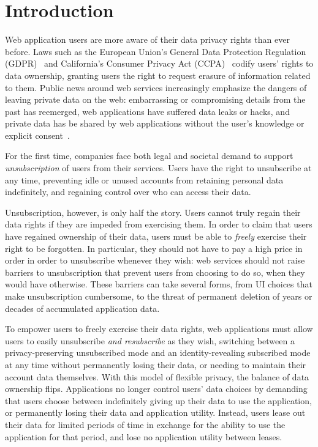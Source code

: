 \section{Introduction}

Web application users are more aware of their data privacy rights than ever before. 
Laws such as the European Union's General Data Protection Regulation (GDPR)~\cite{eu:gdpr} and
California's Consumer Privacy Act (CCPA)~\cite{ca:privacy-act} codify users' rights to 
data ownership, granting users the right to request erasure of information related to them.
%
Public news around web services increasingly emphasize the dangers of leaving private data on the
web: embarrassing or compromising details from the past has reemerged, web applications have 
suffered data leaks or hacks, and private data has be shared by web applications without the user's
knowledge or explicit consent~\cite{nytimes:fb, npr:data}.

%
For the first time, companies face both legal and societal demand to support \emph{unsubscription}
of users from their services. Users have the right to unsubscribe at any time, preventing 
idle or unused accounts from retaining personal data indefinitely, and regaining control over who
can access their data. 
%

%
Unsubscription, however, is only half the story. Users cannot truly regain their data rights if they
are impeded from exercising them.  In order to claim that users have regained ownership of their
data, users must be able to \emph{freely} exercise their right to be forgotten. In particular, they should
not have to pay a high price in order in order to unsubscribe whenever they wish: web services
should not raise barriers to unsubscription that prevent users from choosing to do so, when they
would have otherwise. These barriers can take several forms, from UI choices that make
unsubscription cumbersome, to the threat of permanent deletion of years or decades of
accumulated application data.

To empower users to freely exercise their data rights, web applications must allow users to easily
unsubscribe \emph{and resubscribe} as they wish, switching between a privacy-preserving unsubscribed
mode and an identity-revealing subscribed mode at any time without permanently losing their data, or
needing to maintain their account data themselves. 
%
With this model of flexible privacy, the balance of data ownership flips. Applications no longer
control users' data choices by demanding that users choose between indefinitely giving up their data
to use the application, or permanently losing their data and application utility.
Instead, users lease out their data for limited periods of time in exchange for the ability to use the application for 
that period, and lose no application utility between leases.
%

